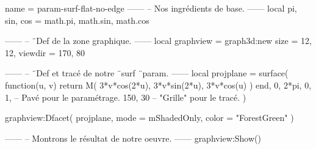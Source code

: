 \documentclass{standalone}
\begin{document}
\begin{luadraw}{name = param-surf-flat-no-edge}
------
-- Nos ingrédients de base.
------
local pi, sin, cos = math.pi, math.sin, math.cos

------
-- ¨Def de la zone graphique.
------
local graphview = graph3d:new{
  size    = {12, 12},
  viewdir = {170, 80}
}

------
-- ¨Def et tracé de notre ¨surf ¨param.
------
local projplane = surface(
  function(u, v)
    return M(
      3*v*cos(2*u),
      3*v*sin(2*u),
      3*v*cos(u)
    )
  end,
  0, 2*pi, 0, 1,  -- Pavé pour le paramétrage.
  {150, 30}       -- "Grille" pour le tracé.
)

graphview:Dfacet(
  projplane,
  {
    mode  = mShadedOnly,
    color = "ForestGreen"
  }
)

------
-- Montrons le résultat de notre oeuvre.
------
graphview:Show()
\end{luadraw}
\end{document}
